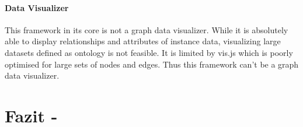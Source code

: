 \paragraph{Data Visualizer}
This framework in its core is not a graph data visualizer. While it is absolutely able to display relationships and attributes of instance data, visualizing 
large datasets defined as ontology is not feasible. It is limited by vis.js which is poorly optimised for large sets of nodes and edges. 
Thus this framework can't be a graph data visualizer. 

\section*{Fazit -}